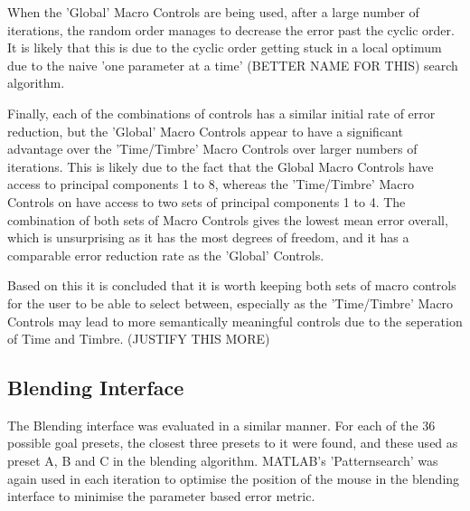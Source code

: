 \documentclass[11pt, oneside]{report}   	%
\begin{document}
When the 'Global' Macro Controls are being used, after a large number of iterations, the random order manages to decrease the error past the cyclic order. It is likely that this is due to the cyclic order getting stuck in a local optimum due to the naive 'one parameter at a time' (BETTER NAME FOR THIS) search algorithm.

Finally, each of the combinations of controls has a similar initial rate of error reduction, but the 'Global' Macro Controls appear to have a significant advantage over the 'Time/Timbre' Macro Controls over larger numbers of iterations. This is likely due to the fact that the Global Macro Controls have access to principal components 1 to 8, whereas the 'Time/Timbre' Macro Controls on have access to two sets of principal components 1 to 4. The combination of both sets of Macro Controls gives the lowest mean error overall, which is unsurprising as it has the most degrees of freedom, and it has a comparable error reduction rate as the 'Global' Controls.

Based on this it is concluded that it is worth keeping both sets of macro controls for the user to be able to select between, especially as the 'Time/Timbre' Macro Controls may lead to more semantically meaningful controls due to the seperation of Time and Timbre. (JUSTIFY THIS MORE)

\subsection{Blending Interface} 
The Blending interface was evaluated in a similar manner. For each of the 36 possible goal presets, the closest three presets to it were found, and these used as preset A, B and C in the blending algorithm. MATLAB's 'Patternsearch' was again used in each iteration to optimise the position of the mouse in the blending interface to minimise the parameter based error metric. 
\end{document}

